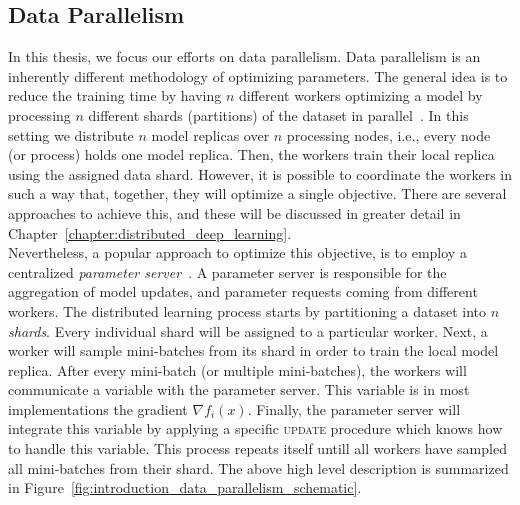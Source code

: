 \subsection{Data Parallelism}
\label{sec:intro_data_parallelism}

In this thesis, we focus our efforts on data parallelism. Data parallelism is an inherently different methodology of optimizing parameters. The general idea is to reduce the training time by having $n$ different workers optimizing a model by processing $n$ different shards (partitions) of the dataset in parallel~\cite{dean2012large}. In this setting we distribute $n$ model replicas over $n$ processing nodes, i.e., every node (or process) holds one model replica. Then, the workers train their local replica using the assigned data shard. However, it is possible to coordinate the workers in such a way that, together, they will optimize a single objective. There are several approaches to achieve this, and these will be discussed in greater detail in Chapter~\ref{chapter:distributed_deep_learning}.\\

Nevertheless, a popular approach to optimize this objective, is to employ a centralized \emph{parameter server}~\cite{dean2012large, zhang2015deep, recht2011hogwild}. A parameter server is responsible for the aggregation of model updates, and parameter requests coming from different workers. The distributed learning process starts by partitioning a dataset into $n$ \emph{shards}. Every individual shard will be assigned to a particular worker. Next, a worker will sample mini-batches from its shard in order to train the local model replica. After every mini-batch (or multiple mini-batches), the workers will communicate a variable with the parameter server. This variable is in most implementations the gradient $\nabla f_i(x)$. Finally, the parameter server will integrate this variable by applying a specific \textsc{update} procedure which knows how to handle this variable. This process repeats itself untill all workers have sampled all mini-batches from their shard. The above high level description is summarized in Figure~\ref{fig:introduction_data_parallelism_schematic}.\\



